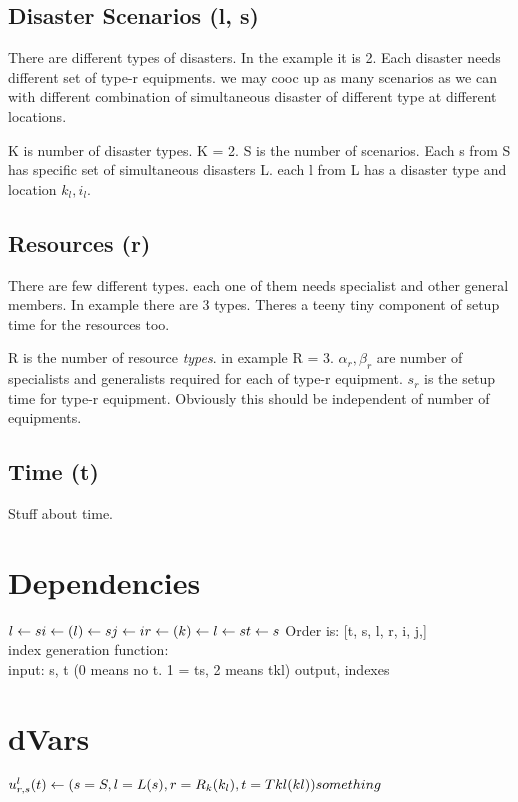 \documentclass[11pt]{article}
\DeclareRobustCommand{\mybox}[2][gray!20]{%
\begin{tcolorbox}[   %
        breakable,
        left=0pt,
        right=0pt,
        top=0pt,
        bottom=0pt,
        colback=#1,
        colframe=#1,
        width=\dimexpr\textwidth\relax, 
        enlarge left by=0mm,
        boxsep=5pt,
        arc=0pt,outer arc=0pt,
        ]
        #2
\end{tcolorbox}
}
\begin{document}
\subsection{Disaster Scenarios (l, s)}
There are different types of disasters. In the example it is 2. Each disaster needs different set of type-r equipments. we may cooc up as many scenarios as we can with different combination of simultaneous disaster of different type at different locations.  
\mybox[green!10]{K is number of disaster types. K = 2. S is the number of scenarios. Each s from S has specific set of simultaneous disasters L. each l from L has a disaster type and location $k_l, i_l$.}

\subsection{Resources (r)} There are few different types. each one of them needs specialist and other general members. In example there are 3 types. Theres a teeny tiny  component of setup time for the resources too. 
\mybox[green!10]{R is the number of resource \textit{types}. in example R = 3. $\alpha_r, \beta_r$ are number of specialists and generalists required for each of type-r equipment. $s_r$ is the setup time for type-r equipment. Obviously this should be independent of number of equipments.}
\subsection{Time (t)}
Stuff about time.

\section{Dependencies}
$
l \leftarrow s\\
i \leftarrow (l) \leftarrow s\\
j \leftarrow i\\
r \leftarrow (k) \leftarrow l \leftarrow s \\
t \leftarrow s\\
$
Order is: [t, s, l, r, i, j,]\\
index generation function:\\
input: s, t (0 means no t. 1 = ts, 2 means tkl)
output, indexes
\section{dVars}
$
u^l_{r,s}(t) \leftarrow (s = S, l = L(s), r = R_k(k_l), t = Tkl(kl) ) \\
something
$
\end{document}
